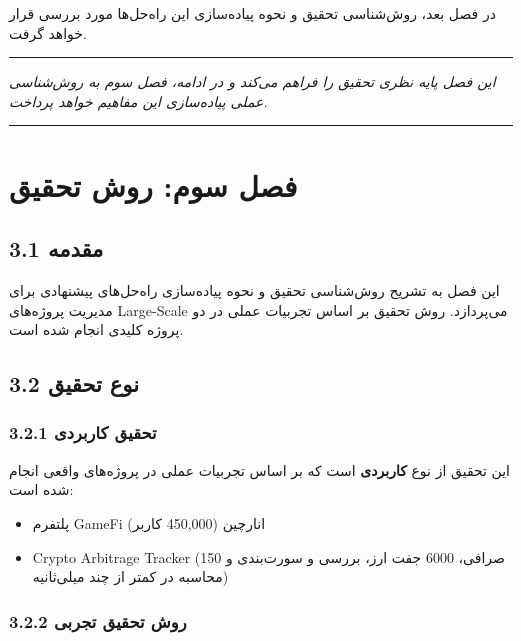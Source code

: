 \documentclass[
]{article}
\providecommand{\tightlist}{%
  \setlength{\itemsep}{0pt}\setlength{\parskip}{0pt}}
\begin{document}
در فصل بعد، روش‌شناسی تحقیق و نحوه پیاده‌سازی این راه‌حل‌ها مورد بررسی قرار
خواهد گرفت.

\begin{center}\rule{0.5\linewidth}{0.5pt}\end{center}

\emph{این فصل پایه نظری تحقیق را فراهم می‌کند و در ادامه، فصل سوم به
روش‌شناسی عملی پیاده‌سازی این مفاهیم خواهد پرداخت.}

\begin{center}\rule{0.5\linewidth}{0.5pt}\end{center}

\section{فصل سوم: روش
تحقیق}\label{ux641ux635ux644-ux633ux648ux645-ux631ux648ux634-ux62aux62dux642ux6ccux642}

\subsection{3.1 مقدمه}\label{ux645ux642ux62fux645ux647-1}

این فصل به تشریح روش‌شناسی تحقیق و نحوه پیاده‌سازی راه‌حل‌های پیشنهادی برای
مدیریت پروژه‌های Large-Scale می‌پردازد. روش تحقیق بر اساس تجربیات عملی در
دو پروژه کلیدی انجام شده است.

\subsection{3.2 نوع
تحقیق}\label{ux646ux648ux639-ux62aux62dux642ux6ccux642}

\subsubsection{3.2.1 تحقیق
کاربردی}\label{ux62aux62dux642ux6ccux642-ux6a9ux627ux631ux628ux631ux62fux6cc}

این تحقیق از نوع \textbf{کاربردی} است که بر اساس تجربیات عملی در
پروژه‌های واقعی انجام شده است:

\begin{itemize}
\tightlist
\item
  پلتفرم GameFi انارچین (450,000 کاربر)
\item
  Crypto Arbitrage Tracker (150 صرافی، 6000 جفت ارز، بررسی و سورت‌بندی و
  محاسبه در کمتر از چند میلی‌ثانیه)
\end{itemize}

\subsubsection{3.2.2 روش تحقیق
تجربی}\label{ux631ux648ux634-ux62aux62dux642ux6ccux642-ux62aux62cux631ux628ux6cc}
\end{document}
